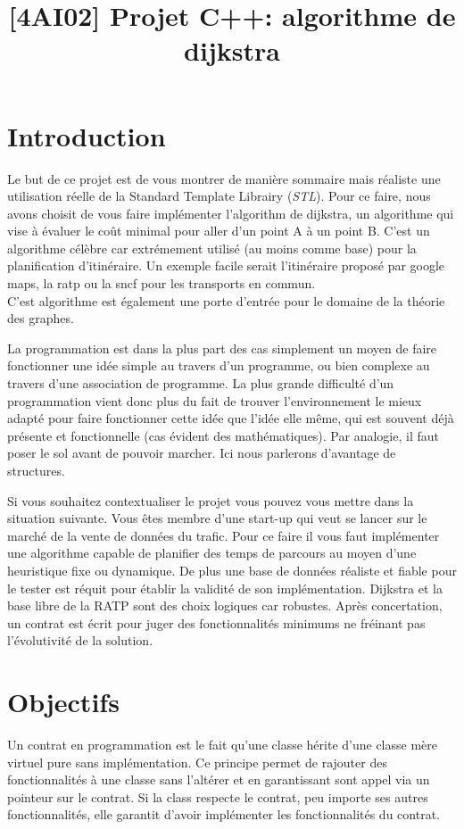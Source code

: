 \documentclass[9pts]{article}
\title{[4AI02] Projet C++: algorithme de dijkstra}
\begin{document}
\maketitle

\section{Introduction}
Le but de ce projet est de vous montrer de manière sommaire mais réaliste une utilisation réelle de la Standard Template Librairy (\emph{STL}).
Pour ce faire, nous avons choisit de vous faire implémenter l'algorithm de dijkstra,
un algorithme qui vise à évaluer le coût minimal pour aller d'un point A à un point B.
C'est un algorithme célèbre car extrémement utilisé (au moins comme base) pour la planification d'itinéraire.
Un exemple facile serait l'itinéraire proposé par google maps, la ratp ou la sncf pour les transports en commun.\\
C'est algorithme est également une porte d'entrée pour le domaine de la théorie des graphes.

La programmation est dans la plus part des cas simplement un moyen de faire fonctionner une idée simple au travers d'un programme,
ou bien complexe au travers d'une association de programme.
La plus grande difficulté d'un programmation vient donc plus du fait de trouver l'environnement le mieux adapté pour faire fonctionner cette idée que l'idée elle même,
qui est souvent déjà présente et fonctionnelle (cas évident des mathématiques).
Par analogie, il faut poser le sol avant de pouvoir marcher.
Ici nous parlerons d'avantage de structures.

Si vous souhaitez contextualiser le projet vous pouvez vous mettre dans la situation suivante.
Vous êtes membre d'une start-up qui veut se lancer sur le marché de la vente de données du trafic.
Pour ce faire il vous faut implémenter une algorithme capable de planifier des temps de parcours au moyen d'une heuristique fixe ou dynamique.
De plus une base de données réaliste et fiable pour le tester est réquit pour établir la validité de son implémentation.
Dijkstra et la base libre de la RATP sont des choix logiques car robustes.
Après concertation, un contrat est écrit pour juger des fonctionnalités minimums ne fréinant pas l'évolutivité de la solution.

\section{Objectifs}
Un contrat en programmation est le fait qu'une classe hérite d'une classe mère virtuel pure sans implémentation.
Ce principe permet de rajouter des fonctionnalités à une classe sans l'altérer et en garantissant sont appel via un pointeur sur le contrat.
Si la class respecte le contrat, peu importe ses autres fonctionnalités, elle garantit d'avoir implémenter les fonctionnalités du contrat. \\
\end{document}
